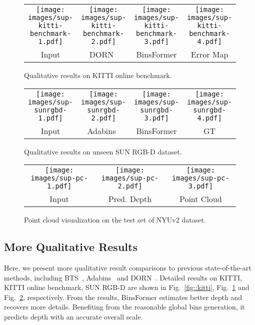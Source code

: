 \documentclass[runningheads]{llncs}
\begin{document}
\begin{figure}[t]
    \begin{tabular}{cccc}
        \texttt{[image: images/sup-kitti-benchmark-1.pdf]}&
        \texttt{[image: images/sup-kitti-benchmark-2.pdf]}&
        \texttt{[image: images/sup-kitti-benchmark-3.pdf]}&
        \texttt{[image: images/sup-kitti-benchmark-4.pdf]}\\
        Input & DORN~\cite{fu2018dorn} & BinsFormer & Error Map
    \end{tabular}
    \caption{Qualitative results on KITTI online benchmark.}
    \label{fig::kitti-benchmark}
\end{figure}
  
\begin{figure}[t]
    \begin{tabular}{cccc}
        \texttt{[image: images/sup-sunrgbd-1.pdf]}&
        \texttt{[image: images/sup-sunrgbd-2.pdf]}&
        \texttt{[image: images/sup-sunrgbd-3.pdf]}&
        \texttt{[image: images/sup-sunrgbd-4.pdf]}\\
        Input & Adabins~\cite{bhat2021adabins} & BinsFormer & GT
    \end{tabular}
    \caption{Qualitative results on unseen SUN RGB-D dataset.}
    \label{fig::sun-rgbd}
\end{figure}

\begin{figure}[t]
    \begin{tabular}{ccc}
        \texttt{[image: images/sup-pc-1.pdf]}&
        \texttt{[image: images/sup-pc-2.pdf]}&
        \texttt{[image: images/sup-pc-3.pdf]}\\
        Input & Pred. Depth & Point Cloud
    \end{tabular}
    \caption{Point cloud visualization on the test set of NYUv2 dataset.}
    \label{fig::pc}
\end{figure}

\subsection{More Qualitative Results}
Here, we present more qualitative result comparisons to previous state-of-the-art methods, including BTS~\cite{lee2019bts}, Adabins~\cite{bhat2021adabins} and DORN~\cite{fu2018dorn}. Detailed results on KITTI, KITTI online benchmark, SUN RGB-D are shown in Fig.~\ref{fig::kitti}, Fig.~\ref{fig::kitti-benchmark} and Fig.~\ref{fig::sun-rgbd}, respectively. From the results, BinsFormer estimates better depth and recovers more details. Benefiting from the reasonable global bins generation, it predicts depth with an accurate overall scale.
\end{document}
